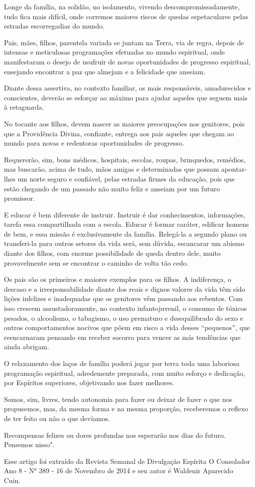 \emdash{}Longe da família, na solidão, no isolamento, vivendo descompromissadamente, tudo fica mais difícil, onde corremos maiores riscos de quedas espetaculares pelas estradas escorregadias do mundo.

\emdash{}Pais, mães, filhos, parentela variada se juntam na Terra, via de regra, depois de intensas e meticulosas programações efetuadas no mundo espiritual, onde manifestaram o desejo de usufruir de novas oportunidades de progresso espiritual, ensejando encontrar a paz que almejam e a felicidade que anseiam.

\emdash{}Diante dessa assertiva, no contexto familiar, os mais responsáveis, amadurecidos e conscientes, deverão se esforçar ao máximo para ajudar aqueles que seguem mais à retaguarda.

\emdash{}No tocante aos filhos, devem nascer as maiores preocupações nos genitores, pois que a Providência Divina, confiante, entrega aos pais aqueles que chegam ao mundo para novas e redentoras oportunidades de progresso.

\emdash{}Requererão, sim, bons médicos, hospitais, escolas, roupas, brinquedos, remédios, mas buscarão, acima de tudo, mãos amigas e determinadas que possam apontar-lhes um norte seguro e confiável, pelas estradas firmes da educação, pois que estão chegando de um passado não muito feliz e anseiam por um futuro promissor.

\emdash{}E educar é bem diferente de instruir. Instruir é dar conhecimentos, informações, tarefa essa compartilhada com a escola. Educar é formar caráter, edificar homens de bem, e essa missão é exclusivamente da família. Relegá-la a segundo plano ou transferi-la para outros setores da vida será, sem dúvida, escancarar um abismo diante dos filhos, com enorme possibilidade de queda dentro dele, muito provavelmente sem se encontrar o caminho de volta tão cedo.

\emdash{}Os pais são os primeiros e maiores exemplos para os filhos. A indiferença, o descaso e a irresponsabilidade diante dos reais e dignos valores da vida têm sido lições infelizes e inadequadas que os genitores vêm passando aos rebentos. Com isso crescem assustadoramente, no contexto infantojuvenil, o consumo de tóxicos pesados, o alcoolismo, o tabagismo, o uso prematuro e desequilibrado do sexo e outros comportamentos nocivos que põem em risco a vida desses “pequenos”, que reencarnaram pensando em receber socorro para vencer as más tendências que ainda abrigam.

\emdash{}O relaxamento dos laços de família poderá jogar por terra toda uma laboriosa programação espiritual, adredemente preparada, com muito esforço e dedicação, por Espíritos superiores, objetivando nos fazer melhores.

\emdash{}Somos, sim, livres, tendo autonomia para fazer ou deixar de fazer o que nos propusemos, mas, da mesma forma e na mesma proporção, receberemos o reflexo de ter feito ou não o que devíamos.

\emdash{}Recompensas felizes ou dores profundas nos esperarão nos dias do futuro. Pensemos nisso".

\emdash{}Esse artigo foi extraído da Revista Semanal de Divulgação Espírita O Consolador Ano 8 - N° 389 - 16 de Novembro de 2014 e seu autor é Waldenir Aparecido Cuin.